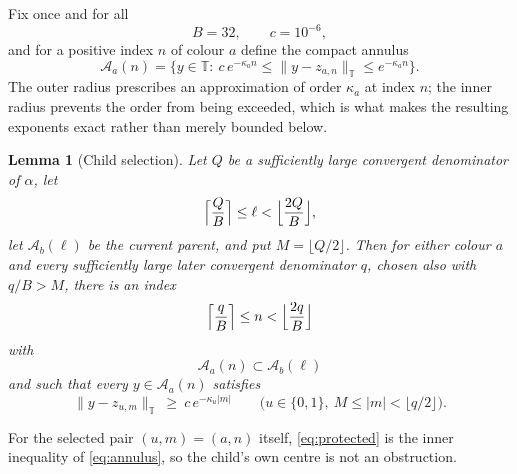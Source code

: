 \documentclass[11pt,reqno]{amsart}
\theoremstyle{plain}
\newtheorem{lemma}[theorem]{Lemma}
\theoremstyle{definition}
\theoremstyle{remark}
\numberwithin{equation}{section}
\begin{document}
Fix once and for all
\begin{equation}
  \label{eq:Bc}
  B=32,\qquad c=10^{-6},
\end{equation}
and for a positive index $n$ of colour $a$ define the compact annulus
\begin{equation}
  \label{eq:annulus}
  \mathcal A_a(n)
  =\bigl\{y\in\mathbb T:\
    c\,e^{-\kappa_a n}\le\lVert y-z_{a,n}\rVert_{\mathbb T}\le e^{-\kappa_a n}
  \bigr\}.
\end{equation}
The outer radius prescribes an approximation of order $\kappa_a$ at index
$n$; the inner radius prevents the order from being exceeded, which is what
makes the resulting exponents exact rather than merely bounded below.

\begin{lemma}[Child selection]
  \label{lem:child}
  Let $Q$ be a sufficiently large convergent denominator of $\alpha$, let
  \begin{equation*}
    \Bigl\lceil\frac QB\Bigr\rceil\le\ell<\Bigl\lfloor\frac{2Q}B\Bigr\rfloor,
  \end{equation*}
  let $\mathcal A_b(\ell)$ be the current parent, and put
  $M=\lfloor Q/2\rfloor$. Then for either colour $a$ and every
  sufficiently large later convergent denominator $q$, chosen also with
  $q/B>M$, there is an index
  \begin{equation}
    \label{eq:child-index}
    \Bigl\lceil\frac qB\Bigr\rceil\le n<\Bigl\lfloor\frac{2q}B\Bigr\rfloor
  \end{equation}
  with
  \begin{equation}
    \label{eq:nested}
    \mathcal A_a(n)\subset\mathcal A_b(\ell)
  \end{equation}
  and such that every $y\in\mathcal A_a(n)$ satisfies
  \begin{equation}
    \label{eq:protected}
    \lVert y-z_{u,m}\rVert_{\mathbb T}\ \ge\ c\,e^{-\kappa_u|m|}
    \qquad
    \bigl(u\in\{0,1\},\ M\le|m|<\lfloor q/2\rfloor\bigr).
  \end{equation}
\end{lemma}

For the selected pair $(u,m)=(a,n)$ itself, \eqref{eq:protected} is the
inner inequality of \eqref{eq:annulus}, so the child's own centre is not an
obstruction.
\end{document}
